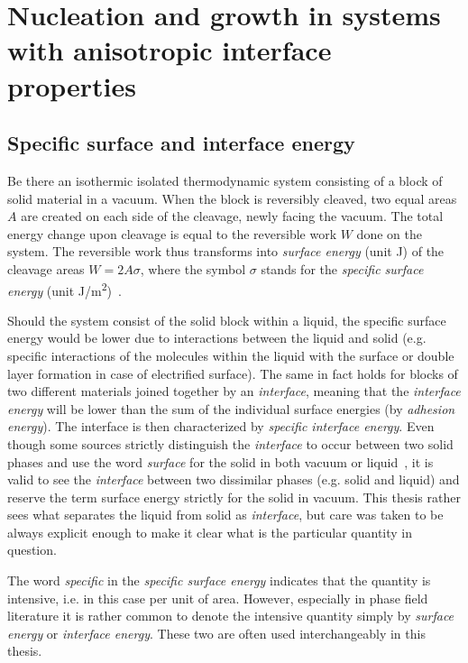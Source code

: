 \chapter{Nucleation and growth in systems with anisotropic interface properties}\label{ch_anisoIEintro}
\section{Specific surface and interface energy}
Be there an isothermic isolated thermodynamic system consisting of a block of solid material in a vacuum. When the block is reversibly cleaved, two equal areas $A$ are created on each side of the cleavage, newly facing the vacuum. The total energy change upon cleavage is equal to the reversible work $W$ done on the system. The reversible work thus transforms into \textit{surface energy} (unit \unit{J}) of the cleavage areas $W=2A\sigma$, where the symbol $\sigma$ stands for the \textit{specific surface energy} (unit \unit{J/m^2})~\cite{Milchev2002}. 

Should the system consist of the solid block within a liquid, the specific surface energy would be lower due to interactions between the liquid and solid (e.g. specific interactions of the molecules within the liquid with the surface or double layer formation in case of electrified surface). The same in fact holds for blocks of two different materials joined together by an \textit{interface}, meaning that the \textit{interface energy} will be lower than the sum of the individual surface energies (by \textit{adhesion energy}). The interface is then characterized by \textit{specific interface energy}. Even though some sources strictly distinguish the \textit{interface} to occur between two solid phases and use the word \textit{surface} for the solid in both vacuum or liquid~\cite{Milchev2002}, it is valid to see the \textit{interface} between two dissimilar phases (e.g. solid and liquid) and reserve the term surface energy strictly for the solid in vacuum. This thesis rather sees what separates the liquid from solid as \textit{interface}, but care was taken to be always explicit enough to make it clear what is the particular quantity in question.

The word \textit{specific} in the \textit{specific surface energy} indicates that the quantity is intensive, i.e. in this case per unit of area. However, especially in phase field literature it is rather common to denote the intensive quantity simply by \textit{surface energy} or \textit{interface energy}. These two are often used interchangeably in this thesis.

